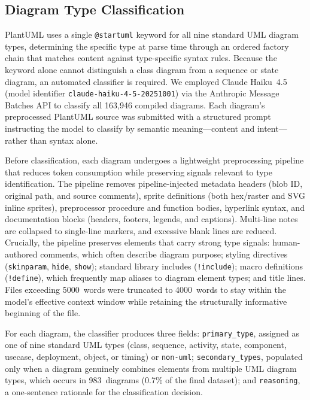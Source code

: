 \documentclass[11pt]{article}
\begin{document}
\subsection{Diagram Type Classification}
\label{sec:classification}

PlantUML uses a single \texttt{@startuml} keyword for all nine standard UML diagram types, determining the specific type at parse time through an ordered factory chain that matches content against type-specific syntax rules. Because the keyword alone cannot distinguish a class diagram from a sequence or state diagram, an automated classifier is required. We employed Claude Haiku~4.5 (model identifier \texttt{claude-haiku-4-5-20251001}) via the Anthropic Message Batches API to classify all 163,946 compiled diagrams. Each diagram's preprocessed PlantUML source was submitted with a structured prompt instructing the model to classify by semantic meaning---content and intent---rather than syntax alone.

Before classification, each diagram undergoes a lightweight preprocessing pipeline that reduces token consumption while preserving signals relevant to type identification. The pipeline removes pipeline-injected metadata headers (blob ID, original path, and source comments), sprite definitions (both hex/raster and SVG inline sprites), preprocessor procedure and function bodies, hyperlink syntax, and documentation blocks (headers, footers, legends, and captions). Multi-line notes are collapsed to single-line markers, and excessive blank lines are reduced. Crucially, the pipeline preserves elements that carry strong type signals: human-authored comments, which often describe diagram purpose; styling directives (\texttt{skinparam}, \texttt{hide}, \texttt{show}); standard library includes (\texttt{!include}); macro definitions (\texttt{!define}), which frequently map aliases to diagram element types; and title lines. Files exceeding 5000~words were truncated to 4000~words to stay within the model's effective context window while retaining the structurally informative beginning of the file.

For each diagram, the classifier produces three fields: \texttt{primary\_type}, assigned as one of nine standard UML types (class, sequence, activity, state, component, usecase, deployment, object, or timing) or \texttt{non-uml}; \texttt{secondary\_types}, populated only when a diagram genuinely combines elements from multiple UML diagram types, which occurs in 983~diagrams (0.7\% of the final dataset); and \texttt{reasoning}, a one-sentence rationale for the classification decision.
\end{document}
